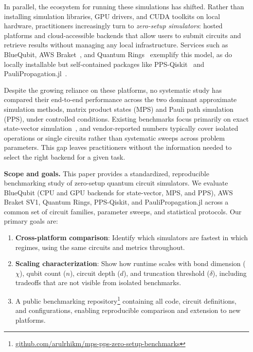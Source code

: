 \documentclass[conference,10pt]{IEEEtran}
\newcommand{\repo}{\href{https://github.com/arulrhikm/mps-pps-zero-setup-benchmarks}{github.com/arulrhikm/mps-pps-zero-setup-benchmarks}}
\begin{document}
In parallel, the ecosystem for running these simulations has shifted. Rather than installing simulation libraries, GPU drivers, and CUDA toolkits on local hardware, practitioners increasingly turn to \emph{zero-setup simulators}: hosted platforms and cloud-accessible backends that allow users to submit circuits and retrieve results without managing any local infrastructure. Services such as BlueQubit, AWS Braket~\cite{aws_braket}, and Quantum Rings~\cite{quantum_rings} exemplify this model, as do locally installable but self-contained packages like PPS-Qiskit~\cite{ppsqiskit} and PauliPropagation.jl~\cite{paulipropagationjl}.

Despite the growing reliance on these platforms, no systematic study has compared their end-to-end performance across the two dominant approximate simulation methods, matrix product states (MPS) and Pauli path simulation (PPS), under controlled conditions. Existing benchmarks focus primarily on exact state-vector simulation~\cite{kordzanganeh2023benchmarking, guerreschi2020intel}, and vendor-reported numbers typically cover isolated operations or single circuits rather than systematic sweeps across problem parameters. This gap leaves practitioners without the information needed to select the right backend for a given task.

\textbf{Scope and goals.} This paper provides a standardized, reproducible benchmarking study of zero-setup quantum circuit simulators. We evaluate BlueQubit (CPU and GPU backends for state-vector, MPS, and PPS), AWS Braket SV1, Quantum Rings, PPS-Qiskit, and PauliPropagation.jl across a common set of circuit families, parameter sweeps, and statistical protocols. Our primary goals are:
\begin{enumerate}
    \item \textbf{Cross-platform comparison}: Identify which simulators are fastest in which regimes, using the same circuits and metrics throughout.
    \item \textbf{Scaling characterization}: Show how runtime scales with bond dimension ($\chi$), qubit count ($n$), circuit depth ($d$), and truncation threshold ($\delta$), including tradeoffs that are not visible from isolated benchmarks.
    \item A public benchmarking repository\footnote{\repo} containing all code, circuit definitions, and configurations, enabling reproducible comparison and extension to new platforms.
\end{enumerate}
\end{document}
